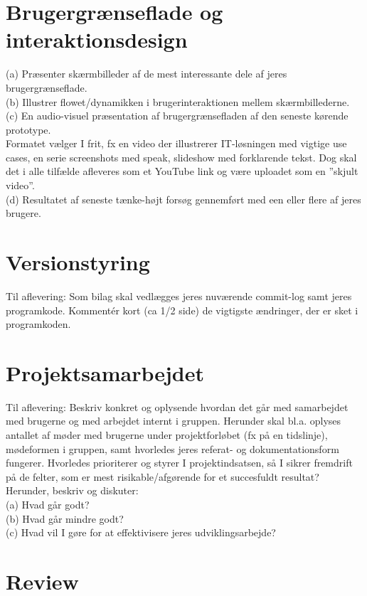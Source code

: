 \documentclass[12pt]{article}
\begin{document}
\section{Brugergrænseflade og interaktionsdesign}
(a) Præsenter skærmbilleder af de mest interessante dele af jeres brugergrænseflade.\\
(b) Illustrer flowet/dynamikken i brugerinteraktionen mellem skærmbillederne.\\
(c) En audio-visuel præsentation af brugergrænsefladen af den seneste kørende prototype.\\
Formatet vælger I frit, fx en video der illustrerer IT-løsningen med vigtige use cases, en serie
screenshots med speak, slideshow med forklarende tekst. Dog skal det i alle tilfælde afleveres som
et YouTube link og være uploadet som en ”skjult video”.\\
(d) Resultatet af seneste tænke-højt forsøg gennemført med een eller flere af jeres brugere.


\section{Versionstyring}
Til aflevering: Som bilag skal vedlægges jeres nuværende commit-log samt jeres
programkode. Kommentér kort (ca 1/2 side) de vigtigste ændringer, der er sket i programkoden.

\section{Projektsamarbejdet}
Til aflevering: Beskriv konkret og oplysende hvordan det går med samarbejdet med brugerne
og med arbejdet internt i gruppen. Herunder skal bl.a. oplyses antallet af møder med brugerne under
projektforløbet (fx på en tidslinje), mødeformen i gruppen, samt hvorledes jeres referat- og
dokumentationsform fungerer. Hvorledes prioriterer og styrer I projektindsatsen, så I sikrer
fremdrift på de felter, som er mest risikable/afgørende for et succesfuldt resultat? Herunder, beskriv
og diskuter:\\
(a) Hvad går godt?\\
(b) Hvad går mindre godt?\\
(c) Hvad vil I gøre for at effektivisere jeres udviklingsarbejde?

\pagebreak
\section{Review}
\end{document}
